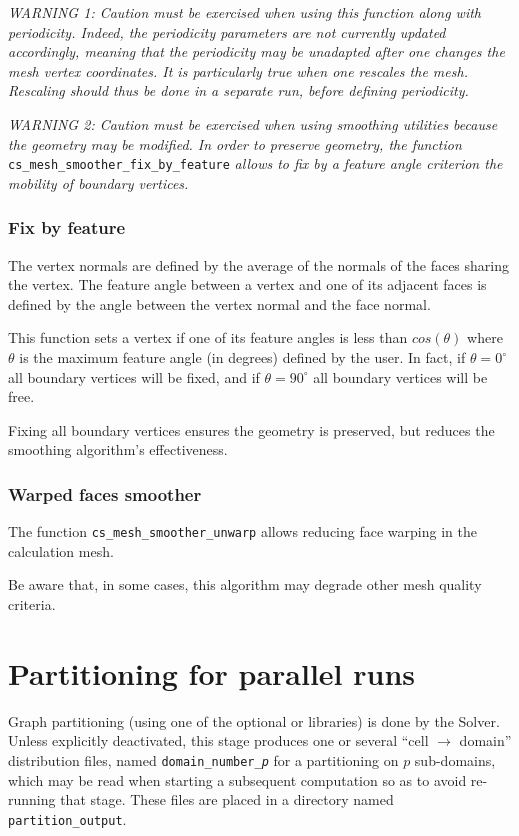 {{{{\em WARNING 1: Caution must be exercised when using this function
along with periodicity. Indeed, the periodicity parameters are not
currently updated accordingly, meaning that the periodicity may be
unadapted after one changes the mesh vertex coordinates. It is particularly
true when one rescales the mesh. Rescaling should thus be done
in a separate run, before defining periodicity.}

{\em WARNING 2: Caution must be exercised when using smoothing utilities
because the geometry may be modified. In order to preserve geometry,
the function} \texttt{cs\_mesh\_smoother\_fix\_by\_feature} {\em allows to
fix by a feature angle criterion the mobility of boundary vertices.}

\subsubsection{Fix by feature}
The vertex normals are defined by the average of the normals of the
faces sharing the vertex.
The feature angle between a vertex and one of its adjacent faces is defined
by the angle between the vertex normal and the face normal.

This function sets a vertex if one of its feature angles is less than
$cos(\theta)$ where $\theta$ is the maximum feature angle (in degrees)
defined by the user.
In fact, if $\theta = 0^{\circ}$ all boundary vertices will be fixed, and
if $\theta = 90^{\circ}$ all boundary vertices will be free.

Fixing all boundary vertices ensures the geometry is preserved, but reduces
the smoothing algorithm's effectiveness.

\subsubsection{Warped faces smoother}

The function \texttt{cs\_mesh\_smoother\_unwarp} allows reducing face warping
in the calculation mesh.

Be aware that, in some cases, this algorithm may degrade other mesh quality
criteria.

\section{Partitioning for parallel runs\label{sec:parall:part}}

Graph partitioning (using one of the optional \metis or
\scotch libraries) is done by the Solver. Unless explicitly
deactivated, this stage produces one or several ``cell $\rightarrow$ domain''
distribution files, named {\tt domain\_number\_\it{p}} for a partitioning on
$p$ sub-domains, which may be read when starting a subsequent computation so as
to avoid re-running that stage. These files are placed in a directory named
{\tt partition\_output}.

}}}
